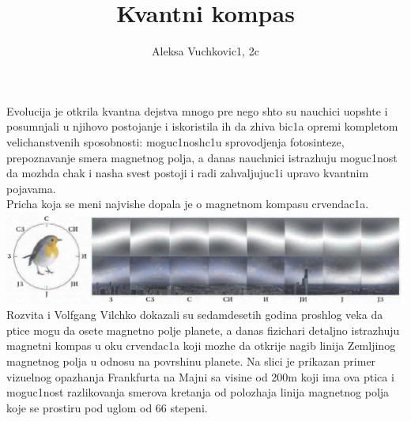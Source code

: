 \documentclass[11pt]{article}
\title{\bf{Kvantni kompas}}
\author{\Large Aleksa Vuchkovic1, 2c}
\date{}
\begin{document}
\maketitle
\Large\noindent
Evolucija je otkrila kvantna dejstva mnogo pre nego shto su nauchici uopshte i posumnjali u njihovo postojanje i iskoristila ih da zhiva bic1a opremi kompletom velichanstvenih sposobnosti: moguc1nosh${}$c1u sprovodjenja fotosinteze, prepoznavanje smera magnetnog polja, a danas nauchnici istrazhuju moguc1nost da mozhda chak i nasha svest postoji i radi zahvaljujuc1i upravo kvantnim pojavama.\\
Pricha koja se meni najvishe dopala je o magnetnom kompasu crvendac1a.\\
\includegraphics[scale=0.8]{Capture}
Rozvita i Volfgang Vilchko dokazali su sedamdesetih godina proshlog veka da ptice mogu da osete magnetno polje planete, a danas fizichari detaljno istrazhuju magnetni kompas u oku crvendac1a koji mozhe da otkrije nagib linija Zemljinog magnetnog polja u odnosu na povrshinu planete. Na slici je prikazan primer vizuelnog opazhanja Frankfurta na Majni sa visine od 200m koji ima ova ptica i moguc1nost razlikovanja smerova kretanja od polozhaja linija magnetnog polja koje se prostiru pod uglom od 66 stepeni.\\
\end{document}
